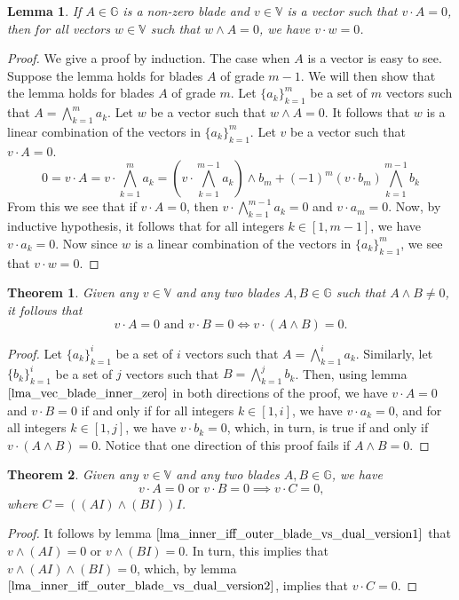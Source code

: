 \documentclass{article}
\newcommand{\V}{\mathbb{V}}
\newcommand{\G}{\mathbb{G}}
\newtheorem{theorem}{Theorem}[section]
\newtheorem{lemma}{Lemma}[section]
\begin{document}
\begin{lemma}\label{lma_vec_blade_inner_zero}
If $A\in\G$ is a non-zero blade and $v\in\V$ is a vector such that $v\cdot A=0$, then
for all vectors $w\in\V$ such that $w\wedge A=0$, we have $v\cdot w=0$.
\end{lemma}
\begin{proof}
We give a proof by induction.  The case when $A$ is a vector is easy to see.
Suppose the lemma holds for blades $A$ of grade $m-1$.  We will then show that the
lemma holds for blades $A$ of grade $m$.  Let $\{a_k\}_{k=1}^m$ be a set of $m$
vectors such that $A=\bigwedge_{k=1}^m a_k$.  Let $w$ be a vector such that
$w\wedge A=0$.  It follows that $w$ is a linear combination of the vectors in $\{a_k\}_{k=1}^m$.
Let $v$ be a vector such that $v\cdot A=0$.
\begin{equation*}
0 = v\cdot A = v\cdot \bigwedge_{k=1}^m a_k
 = \left(v\cdot\bigwedge_{k=1}^{m-1} a_k\right)\wedge b_m + (-1)^m(v\cdot b_m)\bigwedge_{k=1}^{m-1} b_k
\end{equation*}
From this we see that if $v\cdot A=0$, then $v\cdot\bigwedge_{k=1}^{m-1} a_k=0$ and $v\cdot a_m=0$.
Now, by inductive hypothesis, it follows that for all integers $k\in[1,m-1]$, we have $v\cdot a_k=0$.
Now since $w$ is a linear combination of the vectors in $\{a_k\}_{k=1}^m$, we see that $v\cdot w=0$.
\end{proof}

\begin{theorem}\label{thm_intersect}
Given any $v\in\V$ and any two blades $A,B\in\G$ such that $A\wedge B\neq 0$,
it follows that
\begin{equation*}
\mbox{$v\cdot A=0$ and $v\cdot B=0 \iff v\cdot(A\wedge B)=0$.}
\end{equation*}
\end{theorem}
\begin{proof}
Let $\{a_k\}_{k=1}^i$ be a set of $i$ vectors such that $A=\bigwedge_{k=1}^i a_k$.
Similarly, let $\{b_k\}_{k=1}^i$ be a set of $j$ vectors such that
$B=\bigwedge_{k=1}^j b_k$.  Then, using lemma $\eqref{lma_vec_blade_inner_zero}$ in both
directions of the proof, we have
$v\cdot A=0$ and $v\cdot B=0$ if and only if for all integers $k\in[1,i]$,
we have $v\cdot a_k=0$, and for all integers $k\in[1,j]$, we have $v\cdot b_k=0$, which,
in turn, is true if and only if $v\cdot(A\wedge B)=0$.  Notice that one direction of this
proof fails if $A\wedge B=0$.
\end{proof}

\begin{theorem}\label{thm_union_and_more}
Given any $v\in\V$ and any two blades $A,B\in\G$, we have
\begin{equation*}
\mbox{$v\cdot A=0$ or $v\cdot B=0\implies v\cdot C=0$,}
\end{equation*}
where $C=((AI)\wedge(BI))I$.
\end{theorem}
\begin{proof}
It follows by lemma $\eqref{lma_inner_iff_outer_blade_vs_dual_version1}$ that $v\wedge(AI)=0$ or $v\wedge(BI)=0$.  In turn, this implies
that $v\wedge(AI)\wedge(BI)=0$, which, by lemma $\eqref{lma_inner_iff_outer_blade_vs_dual_version2}$, implies that $v\cdot C=0$.
\end{proof}
\end{document}
